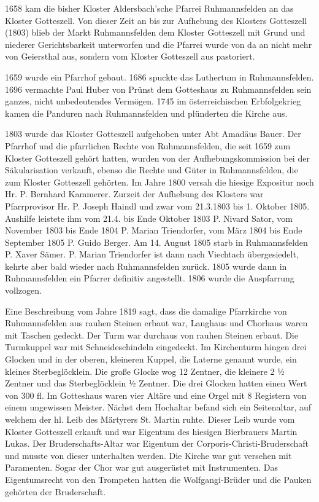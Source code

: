 \documentclass{book}
\begin{document}
1658 kam die bisher Kloster Aldersbach'sche Pfarrei Ruhmannsfelden an das
Kloster Gotteszell. Von dieser Zeit an bis zur Aufhebung des Klosters Gotteszell
(1803) blieb der Markt Ruhmannsfelden dem Kloster Gotteszell mit Grund und
niederer Gerichtsbarkeit unterworfen und die Pfarrei wurde von da an nicht mehr
von Geiersthal aus, sondern vom Kloster Gotteszell aus pastoriert.

1659 wurde ein Pfarrhof gebaut. 1686 spuckte das Luthertum in Ruhmannsfelden.
1696 vermachte Paul Huber von Prünst dem Gotteshaus zu Ruhmannsfelden sein
ganzes, nicht unbedeutendes Vermögen. 1745 im österreichischen Erbfolgekrieg
kamen die Panduren nach Ruhmannsfelden und plünderten die Kirche aus.

1803 wurde das Kloster Gotteszell aufgehoben unter Abt Amadäus Bauer. Der
Pfarrhof und die pfarrlichen Rechte von Ruhmannsfelden, die seit 1659 zum
Kloster Gotteszell gehört hatten, wurden von der Aufhebungskommission bei der
Säkularisation verkauft, ebenso die Rechte und Güter in Ruhmannsfelden, die zum
Kloster Gotteszell gehörten. Im Jahre 1800 versah die hiesige Expositur noch Hr.
P. Bernhard Kammerer. Zurzeit der Aufhebung des Klosters war Pfarrprovisor Hr.
P. Joseph Haindl und zwar vom 21.3.1803 bis 1. Oktober 1805. Aushilfe leistete
ihm vom 21.4. bis Ende Oktober 1803 P. Nivard Sator, vom November 1803 bis Ende
1804 P. Marian Triendorfer, vom März 1804 bis Ende September 1805 P. Guido
Berger. Am 14. August 1805 starb in Ruhmannsfelden P. Xaver Sämer. P. Marian
Triendorfer ist dann nach Viechtach übergesiedelt, kehrte aber bald wieder nach
Ruhmannsfelden zurück. 1805 wurde dann in Ruhmannsfelden ein Pfarrer definitiv
angestellt. 1806 wurde die Auspfarrung vollzogen.

Eine Beschreibung vom Jahre 1819 sagt, dass die damalige Pfarrkirche von
Ruhmannsfelden aus rauhen Steinen erbaut war, Langhaus und Chorhaus waren mit
Taschen gedeckt. Der Turm war durchaus von rauhen Steinen erbaut. Die Turmkuppel
war mit Schneideschindeln eingedeckt. Im Kirchenturm hingen drei Glocken und in
der oberen, kleineren Kuppel, die Laterne genannt wurde, ein kleines
Sterbeglöcklein. Die große Glocke wog 12 Zentner, die kleinere 2 ½  Zentner und
das Sterbeglöcklein ½  Zentner. Die drei Glocken hatten einen Wert von 300 fl.
Im Gotteshaus waren vier Altäre und eine Orgel mit 8 Registern von einem
ungewissen Meister. Nächst dem Hochaltar befand sich ein Seitenaltar, auf
welchem der hl. Leib des Märtyrers St. Martin ruhte. Dieser Leib wurde vom
Kloster Gotteszell erkauft und war Eigentum des hiesigen Bierbrauers Martin
Lukas. Der Bruderschafts-Altar war Eigentum der Corporis-Christi-Bruderschaft
und musste von dieser unterhalten werden. Die Kirche war gut versehen mit
Paramenten. Sogar der Chor war gut ausgerüstet mit Instrumenten. Das
Eigentumsrecht von den Trompeten hatten die Wolfgangi-Brüder und die Pauken
gehörten der Bruderschaft.
\end{document}
